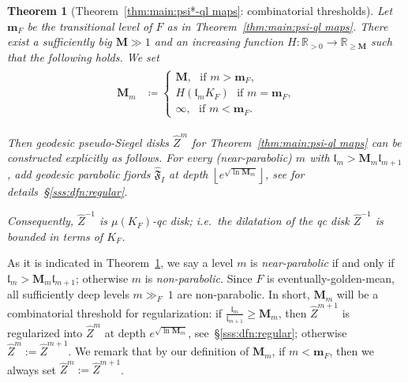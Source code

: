 \documentclass{amsart}
\newcommand{\1}{{\mathbb 1 }}
\newcommand{\hide}[1]{}
\newcommand{\bM}{{\mathbf M}}
\newcommand{\wZ}{{\widehat Z}}
\newcommand{\bbm}{{\mathbf m}}
\newcommand{\length}{{\mathfrak l}}
\newcommand{\R}{\mathbb{R}}
\newtheorem{thm}{Theorem}[section]
\theoremstyle{remark}
\numberwithin{equation}{section}
\theoremstyle{definition}
\begin{document}
\begin{thm}[Theorem~\ref{thm:main:psi*-ql maps}: combinatorial thresholds]
\label{thm:main:psi-ql maps:extra}
Let $\bbm_F$ be the transitional level of $F$ as in Theorem~\ref{thm:main:psi-ql maps}. There exist a sufficiently big $\bM\gg 1$ and an increasing function $H\colon \R_{>0}\to \R_{\ge \bM}$ such that the following holds. We set
\begin{align}
    \label{eq:dfn:bM} 
    \begin{split}
    \bM_m &\coloneqq \begin{cases}
    \bM, \,\, \text{ if $m>\bbm_F$,}\\
     H(\length _m K_F) \,\, \text{ if $m = \bbm_F$,}\\
    \infty, \,\, \text{ if $m < \bbm_F$.}
\end{cases}      
    \end{split}
\end{align} 

Then geodesic pseudo-Siegel disks $\wZ^m$ for Theorem~\ref{thm:main:psi-ql maps} can be constructed explicitly as follows. For every (near-parabolic) $m$ with $\length_{m}> \bM_m \length_{m+1}$, add geodesic parabolic fjords $\widehat{\mathfrak F}_I$ at depth $\left\lfloor e^{\sqrt{ \ln \bM_{m}}}\right\rfloor$, see for details~\S\ref{sss:dfn:regular}.

Consequently, $\wZ^{-1}$ is $\mu(K_F)$-qc disk; i.e.~the dilatation of the qc disk $\wZ^{-1}$ is bounded in terms of $K_F$.
\end{thm}
 
As it is indicated in Theorem~\ref{thm:main:psi-ql maps:extra}, we say a level $m$ is \emph{near-parabolic} if and only if $\length_{m}> \bM_m \length_{m+1}$; otherwise $m$ is \emph{non-parabolic.} Since $F$ is eventually-golden-mean, all sufficiently deep levels $m\gg_F\  1$ are non-parabolic.
 In short, $\bM_m$ will be a combinatorial threshold for regularization: if $\frac{\length_{m}}{\length_{m+1}}\ge \bM_m$, then $\wZ^{m+1}$ is regularized into $\wZ^m$ at depth $e^{\sqrt{ \ln \bM_{m}}}$, see~\S\ref{sss:dfn:regular}; otherwise $\wZ^m:=\wZ^{m+1}$. 
 We remark that by our definition of $\bM_m$, if $m<\bbm_F$, then we always set $\wZ^m := \wZ^{m+1}$. 
 

\hide{In short, $\bM_m$ will be a combinatorial threshold for regularization: if $\frac{\length_{m}}{\length_{m+1}}\ge \bM$ and $m> \bbm_F$, where $\bbm_F$ is the transition level defined in~\S\ref{subsec:aprioribounds}, then $\wZ^{m+1}$ is regularized into $\wZ^m$ at depth $\bM_{\sqrt{\ln}}$, see~\S\ref{sss:dfn:regular}; otherwise $\wZ^m:=\wZ^{m+1}$. If $m<\bbm_F$, then we always set $\wZ^m := \wZ^{m+1}$. The case $m=\bbm_F$ is discussed in~\S\ref{sss:dfn:regular:m_G}.}
\end{document}
